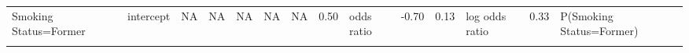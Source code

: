 \begin{landscape}
\begin{table}[!h]
{\begin{tabular}[t]{llllllrrlrrlrl}
Smoking Status=Former & intercept & NA & NA & NA & NA & NA & 0.50 & odds ratio & -0.70 & 0.13 & log odds ratio & 0.33 & P(Smoking Status=Former)\\
\addlinespace
\cellcolor{gray!6}{Smoking Status=No} & \cellcolor{gray!6}{intercept} & \cellcolor{gray!6}{NA} & \cellcolor{gray!6}{NA} & \cellcolor{gray!6}{NA} & \cellcolor{gray!6}{NA} & \cellcolor{gray!6}{NA} & \cellcolor{gray!6}{1.46} & \cellcolor{gray!6}{odds ratio} & \cellcolor{gray!6}{0.38} & \cellcolor{gray!6}{0.09} & \cellcolor{gray!6}{log odds ratio} & \cellcolor{gray!6}{0.59} & \cellcolor{gray!6}{P(Smoking Status=No)}\\
\bottomrule
\end{tabular}}
\end{table}
\end{landscape}